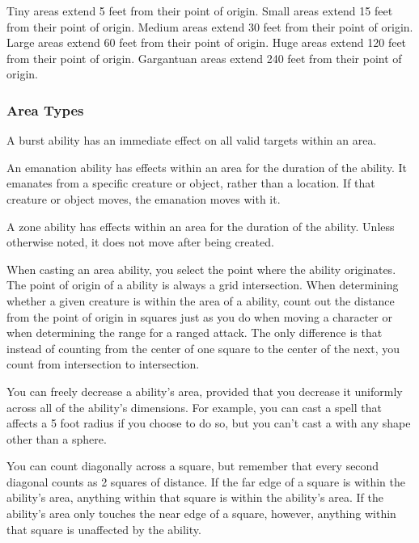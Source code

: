              Tiny areas extend 5 feet from their point of origin.
             Small areas extend 15 feet from their point of origin.
             Medium areas extend 30 feet from their point of origin.
             Large areas extend 60 feet from their point of origin.
             Huge areas extend 120 feet from their point of origin.
             Gargantuan areas extend 240 feet from their point of origin.

        \subsubsection{Area Types}\label{Area Types}

             A burst ability has an immediate effect on all valid targets within an area.

             An emanation ability has effects within an area for the duration of the ability.
            It emanates from a specific creature or object, rather than a location.
            If that creature or object moves, the emanation moves with it.

             A zone ability has effects within an area for the duration of the ability.
            Unless otherwise noted, it does not move after being created.

            When casting an area ability, you select the point where the ability originates.
            The point of origin of a ability is always a grid intersection.
            When determining whether a given creature is within the area of a ability, count out the distance from the point of origin in squares just as you do when moving a character or when determining the range for a ranged attack.
            The only difference is that instead of counting from the center of one square to the center of the next, you count from intersection to intersection.

            You can freely decrease a ability's area, provided that you decrease it uniformly across all of the ability's dimensions.
            For example, you can cast a  spell that affects a 5 foot radius if you choose to do so, but you can't cast a  with any shape other than a sphere.

            You can count diagonally across a square, but remember that every second diagonal counts as 2 squares of distance.
            If the far edge of a square is within the ability's area, anything within that square is within the ability's area.
            If the ability's area only touches the near edge of a square, however, anything within that square is unaffected by the ability.

